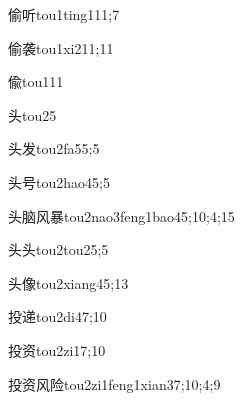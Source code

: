 \begin{verbete}{偷听}{tou1ting1}{11;7}
\end{verbete}

\begin{verbete}{偷袭}{tou1xi2}{11;11}
\end{verbete}

\begin{verbete}{偸}{tou1}{11}
\end{verbete}

\begin{verbete}{头}{tou2}{5}
\end{verbete}

\begin{verbete}{头发}{tou2fa5}{5;5}
\end{verbete}

\begin{verbete}{头号}{tou2hao4}{5;5}
\end{verbete}

\begin{verbete}{头脑风暴}{tou2nao3feng1bao4}{5;10;4;15}
\end{verbete}

\begin{verbete}{头头}{tou2tou2}{5;5}
\end{verbete}

\begin{verbete}{头像}{tou2xiang4}{5;13}
\end{verbete}

\begin{verbete}{投递}{tou2di4}{7;10}
\end{verbete}

\begin{verbete}{投资}{tou2zi1}{7;10}
\end{verbete}

\begin{verbete}{投资风险}{tou2zi1feng1xian3}{7;10;4;9}
\end{verbete}

